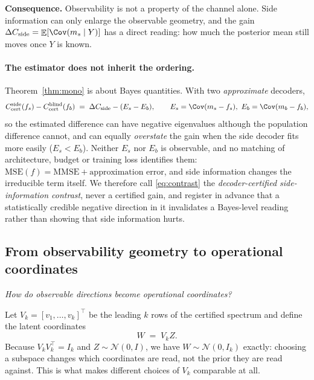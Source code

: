 \documentclass{article}
\theoremstyle{definition}
\DeclareMathOperator{\Exp}{\mathbb{E}}
\newcommand{\Ccert}{C_{\mathrm{cert}}}
\begin{document}
\noindent\textbf{Consequence.} Observability is not a property of the channel alone. Side
information can only enlarge the observable geometry, and the gain
$\Delta C_{\mathrm{side}}=\Exp[\Cov(m_s\mid Y)]$ has a direct reading: how much the
posterior mean still moves once $Y$ is known.


\paragraph{The estimator does not inherit the ordering.}
Theorem~\ref{thm:mono} is about Bayes quantities. With two \emph{approximate} decoders,
\begin{equation}
  \Ccert^{\mathrm{side}}(f_s)-\Ccert^{\mathrm{blind}}(f_b)
  \;=\;\Delta C_{\mathrm{side}}-(E_s-E_b),\qquad
  E_s=\Cov(m_s-f_s),\ E_b=\Cov(m_b-f_b),
  \label{eq:contrast}
\end{equation}
so the estimated difference can have negative eigenvalues although the population
difference cannot, and can equally \emph{overstate} the gain when the side decoder fits
more easily ($E_s<E_b$). Neither $E_s$ nor $E_b$ is observable, and no matching of
architecture, budget or training loss identifies them: $\mathrm{MSE}(f)=\mathrm{MMSE}+
\text{approximation error}$, and side information changes the irreducible term itself. We
therefore call \eqref{eq:contrast} the \emph{decoder-certified side-information
contrast}, never a certified gain, and register in advance that a statistically credible
negative direction in it invalidates a Bayes-level reading rather than showing that side
information hurts.

\subsection{From observability geometry to operational coordinates}
\label{sec:operational}

\emph{How do observable directions become operational coordinates?}

Let $V_k=[v_1,\dots,v_k]^\top$ be the leading $k$ rows of the certified spectrum and define
the latent coordinates
\begin{equation}
  W \;=\; V_kZ .
  \label{eq:coords}
\end{equation}
Because $V_kV_k^\top=I_k$ and $Z\sim\mathcal N(0,I)$, we have $W\sim\mathcal N(0,I_k)$
exactly: choosing a subspace changes which coordinates are read, not the prior they are
read against. This is what makes different choices of $V_k$ comparable at all.
\end{document}
